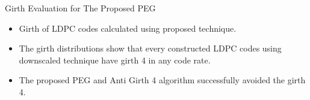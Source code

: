 \documentclass[11pt, aspectratio=169]{beamer}
\begin{document}
\begin{frame}{Girth Evaluation for The Proposed PEG}
\vspace{0.5cm}


		\begin{itemize}
			\item Girth of LDPC codes calculated using proposed technique.
			\item The girth distributions show that every constructed LDPC codes using downscaled technique have girth 4 in any code rate.
			\item The proposed PEG and Anti Girth 4 algorithm successfully avoided the girth 4.
		\end{itemize}
\end{frame}
\end{document}
